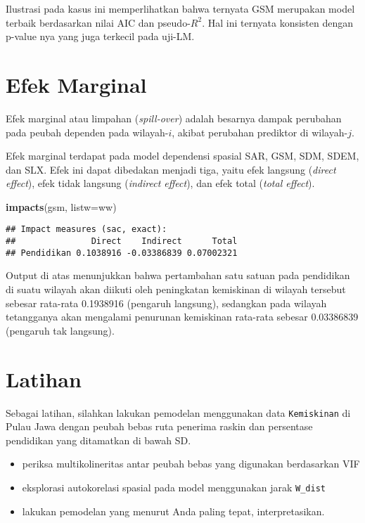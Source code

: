 \documentclass[
]{book}
\newenvironment{Shaded}{\begin{snugshade}}{\end{snugshade}}
\newcommand{\DataTypeTok}[1]{\textcolor[rgb]{0.13,0.29,0.53}{#1}}
\newcommand{\KeywordTok}[1]{\textcolor[rgb]{0.13,0.29,0.53}{\textbf{#1}}}
\newcommand{\NormalTok}[1]{#1}
\begin{document}
Ilustrasi pada kasus ini memperlihatkan bahwa ternyata GSM merupakan model terbaik berdasarkan nilai AIC dan pseudo-\(R^2\). Hal ini ternyata konsisten dengan p-value nya yang juga terkecil pada uji-LM.

\hypertarget{efek-marginal}{%
\section{Efek Marginal}\label{efek-marginal}}

Efek marginal atau limpahan (\emph{spill-over}) adalah besarnya dampak perubahan pada peubah dependen pada wilayah-\(i\), akibat perubahan prediktor di wilayah-\(j\).

Efek marginal terdapat pada model dependensi spasial SAR, GSM, SDM, SDEM, dan SLX. Efek ini dapat dibedakan menjadi tiga, yaitu efek langsung (\emph{direct effect}), efek tidak langsung (\emph{indirect effect}), dan efek total (\emph{total effect}).

\begin{Shaded}
\begin{Highlighting}[]
\KeywordTok{impacts}\NormalTok{(gsm, }\DataTypeTok{listw=}\NormalTok{ww)}
\end{Highlighting}
\end{Shaded}

\begin{verbatim}
## Impact measures (sac, exact):
##               Direct    Indirect      Total
## Pendidikan 0.1038916 -0.03386839 0.07002321
\end{verbatim}

Output di atas menunjukkan bahwa pertambahan satu satuan pada pendidikan di suatu wilayah akan diikuti oleh peningkatan kemiskinan di wilayah tersebut sebesar rata-rata 0.1938916 (pengaruh langsung), sedangkan pada wilayah tetangganya akan mengalami penurunan kemiskinan rata-rata sebesar 0.03386839 (pengaruh tak langsung).

\hypertarget{latihan}{%
\section{Latihan}\label{latihan}}

Sebagai latihan, silahkan lakukan pemodelan menggunakan data \texttt{Kemiskinan} di Pulau Jawa dengan peubah bebas ruta penerima raskin dan persentase pendidikan yang ditamatkan di bawah SD.

\begin{itemize}
\item
  periksa multikolineritas antar peubah bebas yang digunakan berdasarkan VIF
\item
  eksplorasi autokorelasi spasial pada model menggunakan jarak \texttt{W\_dist}
\item
  lakukan pemodelan yang menurut Anda paling tepat, interpretasikan.
\end{itemize}
\end{document}
